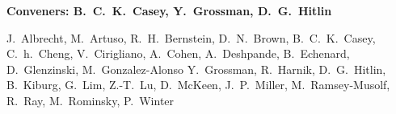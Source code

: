 

\begin{center}

\begin{large} {\bf Conveners: B.~C.~K.~Casey, Y.~Grossman, D.~G.~Hitlin} \end{large}

J.~Albrecht,
M.~Artuso,
R.~H.~Bernstein,
D.~N.~Brown,
B.~C.~K.~Casey,
C.~h.~Cheng,
V.~Cirigliano,
A.~Cohen,
A.~Deshpande,
B.~Echenard,
D.~Glenzinski,
M.~Gonzalez-Alonso
Y.~Grossman,
R.~Harnik,
D.~G.~Hitlin, 
B.~Kiburg,
G.~Lim,
Z.-T.~Lu,
D.~McKeen,
J.~P.~Miller,
M.~Ramsey-Musolf,
R.~Ray,
M.~Rominsky,
P.~Winter 


\end{center}

